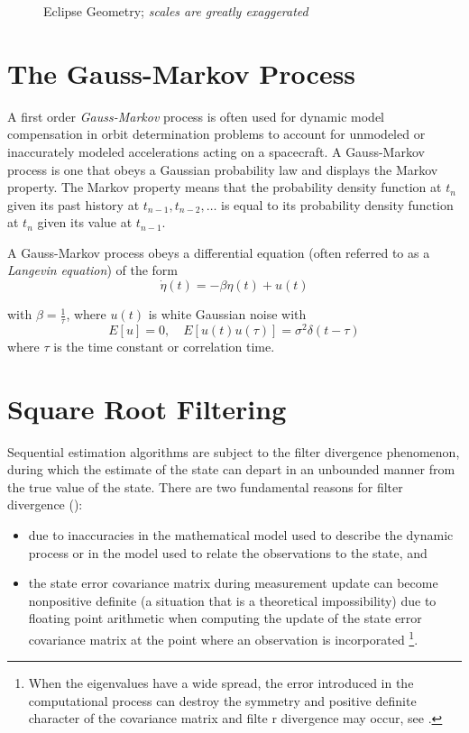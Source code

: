 \begin{figure}
\centering

\caption{Eclipse Geometry; \emph{scales are greatly exaggerated}}
\label{fig:eclipse-geometry}
\end{figure}

\section{The Gauss-Markov Process}
\label{sec:gauss-markov}
A first order \emph{Gauss-Markov} process is often used for dynamic model compensation 
in orbit determination problems to account for unmodeled or inaccurately
modeled accelerations acting on a spacecraft. A Gauss-Markov process is one that
obeys a Gaussian probability law and displays the Markov property. The Markov
property means that the probability density function at \(t_n\) given its past history at
\(t_{n-1} , t_{n-2} , \ldots \) is equal to its probability density function at 
\(t_n\) given its value at \(t_{n-1}\).

A Gauss-Markov process obeys a differential equation (often referred to as a 
\emph{Langevin equation}) of the form
\begin{equation}
  \label{eq:tapley4951}
  \dot{\eta} (t) = - \beta \eta (t) + u (t) 
\end{equation}

with \(\beta = \frac{1}{\tau}\), where \(u(t)\) is white Gaussian noise with
\begin{equation}
  \label{eq:tapley4952}
    E \left[ u \right] = 0, \quad E \left[ u(t) u(\tau ) \right] = \sigma ^2 \delta (t - \tau )
\end{equation}
 where \(\tau\) is the time constant or correlation time. 

\section{Square Root Filtering}
\label{sec:square-root-filtering}
Sequential estimation algorithms are subject to the filter divergence phenomenon, during
which the estimate of the state can depart in an unbounded manner from the true value
of the state. There are two fundamental reasons for filter divergence (\cite{tapley}):
\begin{itemize}
	\item due to inaccuracies in the mathematical model used to describe the dynamic
	      process or in the model used to relate the observations to the state, and
	\item the state error covariance matrix during measurement update can become nonpositive
	      definite (a situation that is a theoretical impossibility) due to floating point
	      arithmetic when computing the update of the state error covariance matrix at the
	      point where an observation is incorporated \footnote{When the eigenvalues have a wide spread, the error
		      introduced in the computational process can destroy the symmetry and positive
		      definite character of the covariance matrix and filte r divergence may occur, see \cite{tapley}.}.
\end{itemize}

